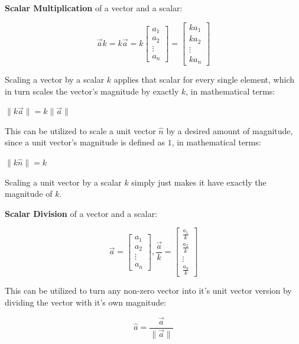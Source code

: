 \sgap

\textbf{Scalar Multiplication} of a vector and a scalar:
\begin{center}
    \[
        {\vec{a}}k=k{\vec{a}}=k \begin{bmatrix}a_1 \\ a_2 \\ \vdots \\ a_n\end{bmatrix}=\begin{bmatrix}ka_1 \\ ka_2 \\ \vdots \\ ka_n\end{bmatrix}
    \]
\end{center}

Scaling a vector by a scalar $k$ applies that scalar for every single element, which in turn scales the vector's magnitude by exactly $k$, in mathematical terms:
\begin{center}
    $\|k\vec{a}\|=k\|\vec{a}\|$
\end{center}

This can be utilized to scale a unit vector $\hat{n}$ by a desired amount of magnitude, since a unit vector's magnitude is defined as $1$, in mathematical terms:
\begin{center}
    $\|k\hat{n}\| = k$
\end{center}

Scaling a unit vector by a scalar $k$ simply just makes it have exactly the magnitude of $k$.


\sgap

\textbf{Scalar Division} of a vector and a scalar:
\begin{center}
    \[
        \vec{a}=\begin{bmatrix}a_1 \\ a_2 \\ \vdots \\ a_n\end{bmatrix},\frac{\vec{a}}{k}=\begin{bmatrix}\frac{a_1}{k} \\ \frac{a_2}{k} \\ \vdots \\ \frac{a_n}{k}\end{bmatrix}
    \]
\end{center}

This can be utilized to turn any non-zero vector into it's unit vector version by dividing the vector with it's own magnitude:
\begin{center}
    \[
        {\hat{a}}=\frac{\vec{a}}{\|\vec{a}\|}
    \]
\end{center}

